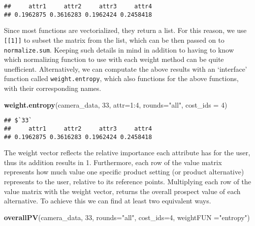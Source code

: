 \documentclass[]{article}
\newenvironment{Shaded}{\begin{snugshade}}{\end{snugshade}}
\newcommand{\KeywordTok}[1]{\textcolor[rgb]{0.13,0.29,0.53}{\textbf{{#1}}}}
\newcommand{\DataTypeTok}[1]{\textcolor[rgb]{0.13,0.29,0.53}{{#1}}}
\newcommand{\DecValTok}[1]{\textcolor[rgb]{0.00,0.00,0.81}{{#1}}}
\newcommand{\StringTok}[1]{\textcolor[rgb]{0.31,0.60,0.02}{{#1}}}
\newcommand{\NormalTok}[1]{{#1}}
\begin{document}
\begin{verbatim}
##     attr1     attr2     attr3     attr4 
## 0.1962875 0.3616283 0.1962424 0.2458418
\end{verbatim}

Since most functions are vectorialized, they return a list. For this
reason, we use \texttt{[[1]]} to subset the matrix from the list, which
can be then passed on to \texttt{normalize.sum}. Keeping such details in
mind in addition to having to know which normalizing function to use
with each weight method can be quite unefficient. Alternatively, we can
computate the above results with an `interface' function called
\texttt{weight.entropy}, which also functions for the above functions,
with their corresponding names.

\begin{Shaded}
\begin{Highlighting}[]
\KeywordTok{weight.entropy}\NormalTok{(camera_data, }\DecValTok{33}\NormalTok{, }\DataTypeTok{attr=}\DecValTok{1}\NormalTok{:}\DecValTok{4}\NormalTok{, }\DataTypeTok{rounds=}\StringTok{"all"}\NormalTok{, }\DataTypeTok{cost_ids =} \DecValTok{4}\NormalTok{)}
\end{Highlighting}
\end{Shaded}

\begin{verbatim}
## $`33`
##     attr1     attr2     attr3     attr4 
## 0.1962875 0.3616283 0.1962424 0.2458418
\end{verbatim}

The weight vector reflects the relative importance each attribute has
for the user, thus its addition results in 1. Furthermore, each row of
the value matrix represents how much value one specific product setting
(or product alternative) represents to the user, relative to its
reference points. Multiplying each row of the value matrix with the
weight vector, returns the overall prospect value of each alternative.
To achieve this we can find at least two equivalent ways.

\begin{Shaded}
\begin{Highlighting}[]
\KeywordTok{overallPV}\NormalTok{(camera_data, }\DecValTok{33}\NormalTok{, }\DataTypeTok{rounds=}\StringTok{"all"}\NormalTok{, }\DataTypeTok{cost_ids=}\DecValTok{4}\NormalTok{, }\DataTypeTok{weightFUN =}\StringTok{"entropy"}\NormalTok{)}
\end{Highlighting}
\end{Shaded}
\end{document}
